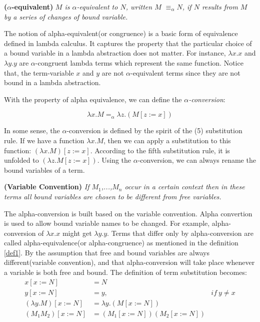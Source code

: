 \begin{def1}\label{def1}
\normalfont \textbf{($\alpha$-equivalent)} \textit{$M$ is $\alpha$-equivalent to $N$, written $M$ $\equiv_\alpha N$, if $N$ results from $M$ by a series of changes of bound variable.}
\end{def1}

The notion of alpha-equivalent(or congruence) is a basic form of equivalence defined in lambda calculus. It captures the property that the particular choice of a bound variable in a lambda abstraction does not matter. For instance, $\lambda x.x$ and $\lambda y.y$ are $\alpha$-congruent lambda terms which represent the same function. Notice that, the term-variable $x$ and $y$ are not $\alpha$-equivalent terms since they are not bound in a lambda abstraction.

With the property of alpha equivalence, we can define the \textit{$\alpha$-conversion}:

\begin{equation*}
\lambda x.M =_\alpha \lambda z.(M[z:=x])
\end{equation*}

In some sense, the $\alpha$-conversion is defined by the spirit of the (5) substitution rule. If we have a function $\lambda x.M$, then we can apply a substitution to this function: $(\lambda x.M)[z:=x]$. According to the fifth substitution rule, it is unfolded to $(\lambda z.M[z:=x])$. Using the $\alpha$-conversion, we can always rename the bound variables of a term. 

\begin{def1}
\normalfont \textbf{(Variable Convention\cite{hankin1994lambda})} \textit{If $M_1$,...,$M_n$ occur in a certain context then in these terms all bound variables are chosen to be different from free variables.}
\end{def1}

The alpha-conversion is built based on the variable convention. Alpha convertion is used to allow bound variable names to be changed. For example, alpha-conversion of $\lambda x.x$ might get $\lambda y.y$. Terms that differ only by alpha-conversion are called alpha-equivalence(or alpha-congruence) as mentioned in the definition \ref{def1}. By the assumption that free and bound variables are always different(variable convention), and that alpha-conversion will take place whenever a variable is both free and bound. The definition of term substitution becomes:
\begin{equation*}
\begin{array}{rll}
x[x:=N]&=N & ~\\
y[x:=N]&=y,& if\ y\neq x\\
(\lambda y.M)[x:=N]&=\lambda y.(M[x:=N])& \\
(M_1M_2)[x:=N] &= (M_1[x:=N])(M_2[x:=N])&
\end{array} 
\end{equation*}

